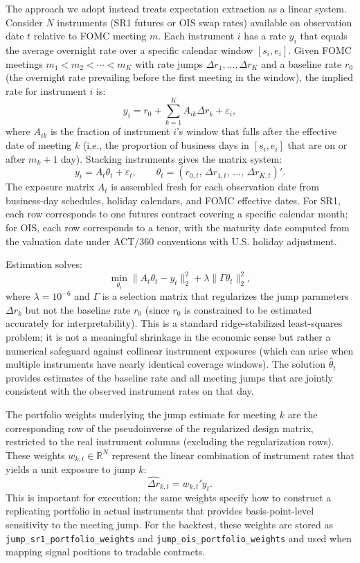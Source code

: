The approach we adopt instead treats expectation extraction as a linear system. Consider $N$ instruments (SR1 futures or OIS swap rates) available on observation date $t$ relative to FOMC meeting $m$. Each instrument $i$ has a rate $y_i$ that equals the average overnight rate over a specific calendar window $[s_i, e_i]$. Given FOMC meetings $m_1 < m_2 < \cdots < m_K$ with rate jumps $\Delta r_1, \ldots, \Delta r_K$ and a baseline rate $r_0$ (the overnight rate prevailing before the first meeting in the window), the implied rate for instrument $i$ is:
\[
y_i = r_0 + \sum_{k=1}^{K} A_{ik} \Delta r_k + \varepsilon_i,
\]
where $A_{ik}$ is the fraction of instrument $i$'s window that falls after the effective date of meeting $k$ (i.e., the proportion of business days in $[s_i, e_i]$ that are on or after $m_k + 1$ day). Stacking instruments gives the matrix system:
\[
y_t = A_t \theta_t + \varepsilon_t, \qquad \theta_t = (r_{0,t},\, \Delta r_{1,t},\, \ldots,\, \Delta r_{K,t})'.
\]
The exposure matrix $A_t$ is assembled fresh for each observation date from business-day schedules, holiday calendars, and FOMC effective dates. For SR1, each row corresponds to one futures contract covering a specific calendar month; for OIS, each row corresponds to a tenor, with the maturity date computed from the valuation date under ACT/360 conventions with U.S. holiday adjustment.

Estimation solves:
\[
\min_{\theta_t} \|A_t \theta_t - y_t\|_2^2 + \lambda \|\Gamma \theta_t\|_2^2,
\]
where $\lambda = 10^{-6}$ and $\Gamma$ is a selection matrix that regularizes the jump parameters $\Delta r_k$ but not the baseline rate $r_0$ (since $r_0$ is constrained to be estimated accurately for interpretability). This is a standard ridge-stabilized least-squares problem; it is not a meaningful shrinkage in the economic sense but rather a numerical safeguard against collinear instrument exposures (which can arise when multiple instruments have nearly identical coverage windows). The solution $\hat{\theta}_t$ provides estimates of the baseline rate and all meeting jumps that are jointly consistent with the observed instrument rates on that day.

The portfolio weights underlying the jump estimate for meeting $k$ are the corresponding row of the pseudoinverse of the regularized design matrix, restricted to the real instrument columns (excluding the regularization rows). These weights $w_{k,t} \in \mathbb{R}^N$ represent the linear combination of instrument rates that yields a unit exposure to jump $k$:
\[
\hat{\Delta r}_{k,t} = w_{k,t}' y_t.
\]
This is important for execution: the same weights specify how to construct a replicating portfolio in actual instruments that provides basis-point-level sensitivity to the meeting jump. For the backtest, these weights are stored as \texttt{jump\_sr1\_portfolio\_weights} and \texttt{jump\_ois\_portfolio\_weights} and used when mapping signal positions to tradable contracts.

